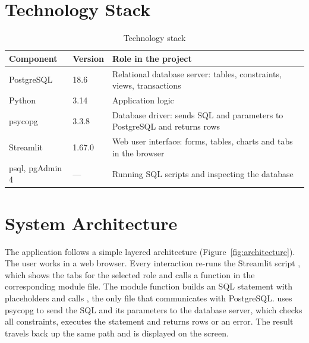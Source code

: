 \section{Technology Stack}
\label{sec:tech}
\begin{table}[H]
  \centering
  \caption{Technology stack}
  \label{tab:tech}
  \begin{tabularx}{\textwidth}{@{}llX@{}}
    \toprule
    \textbf{Component} & \textbf{Version} & \textbf{Role in the project} \\
    \midrule
    PostgreSQL   & 18.6   & Relational database server: tables, constraints, views, transactions \\
    Python       & 3.14   & Application logic \\
    psycopg      & 3.3.8  & Database driver: sends SQL and parameters to PostgreSQL and returns rows \\
    Streamlit    & 1.67.0 & Web user interface: forms, tables, charts and tabs in the browser \\
    psql, pgAdmin 4 & ---  & Running SQL scripts and inspecting the database \\
    \bottomrule
  \end{tabularx}
\end{table}

\section{System Architecture}
\label{sec:architecture}
The application follows a simple layered architecture (Figure~\ref{fig:architecture}). The
user works in a web browser. Every interaction re-runs the Streamlit script ,
which shows the tabs for the selected role and calls a function in the corresponding module
file. The module function builds an SQL statement with  placeholders and calls
, the only file that communicates with PostgreSQL.  uses psycopg to send
the SQL and its parameters to the database server, which checks all constraints, executes the
statement and returns rows or an error. The result travels back up the same path and is
displayed on the screen.

